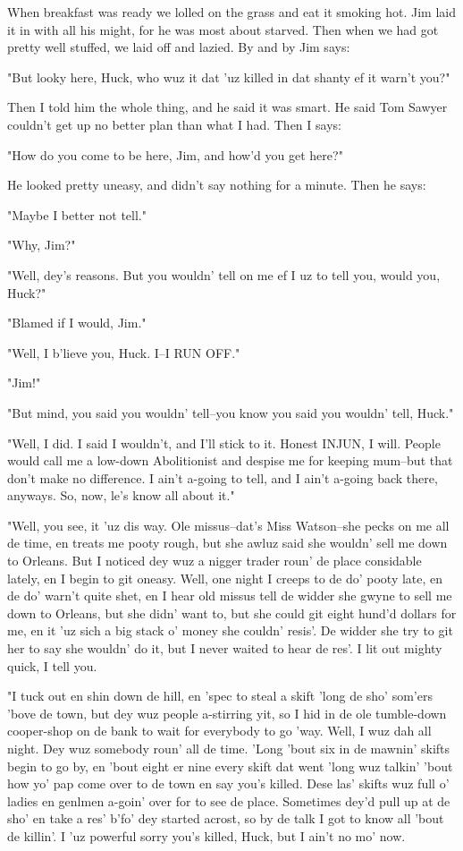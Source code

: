 When breakfast was ready we lolled on the grass and eat it smoking hot.
Jim laid it in with all his might, for he was most about starved.  Then
when we had got pretty well stuffed, we laid off and lazied.  By and by
Jim says:

"But looky here, Huck, who wuz it dat 'uz killed in dat shanty ef it
warn't you?"

Then I told him the whole thing, and he said it was smart.  He said Tom
Sawyer couldn't get up no better plan than what I had.  Then I says:

"How do you come to be here, Jim, and how'd you get here?"

He looked pretty uneasy, and didn't say nothing for a minute.  Then he
says:

"Maybe I better not tell."

"Why, Jim?"

"Well, dey's reasons.  But you wouldn' tell on me ef I uz to tell you,
would you, Huck?"

"Blamed if I would, Jim."

"Well, I b'lieve you, Huck.  I--I RUN OFF."

"Jim!"

"But mind, you said you wouldn' tell--you know you said you wouldn' tell,
Huck."

"Well, I did.  I said I wouldn't, and I'll stick to it.  Honest INJUN, I
will.  People would call me a low-down Abolitionist and despise me for
keeping mum--but that don't make no difference.  I ain't a-going to tell,
and I ain't a-going back there, anyways.  So, now, le's know all about
it."

"Well, you see, it 'uz dis way.  Ole missus--dat's Miss Watson--she pecks
on me all de time, en treats me pooty rough, but she awluz said she
wouldn' sell me down to Orleans.  But I noticed dey wuz a nigger trader
roun' de place considable lately, en I begin to git oneasy.  Well, one
night I creeps to de do' pooty late, en de do' warn't quite shet, en I
hear old missus tell de widder she gwyne to sell me down to Orleans, but
she didn' want to, but she could git eight hund'd dollars for me, en it
'uz sich a big stack o' money she couldn' resis'.  De widder she try to
git her to say she wouldn' do it, but I never waited to hear de res'.  I
lit out mighty quick, I tell you.

"I tuck out en shin down de hill, en 'spec to steal a skift 'long de sho'
som'ers 'bove de town, but dey wuz people a-stirring yit, so I hid in de
ole tumble-down cooper-shop on de bank to wait for everybody to go 'way.
Well, I wuz dah all night.  Dey wuz somebody roun' all de time.  'Long
'bout six in de mawnin' skifts begin to go by, en 'bout eight er nine
every skift dat went 'long wuz talkin' 'bout how yo' pap come over to de
town en say you's killed.  Dese las' skifts wuz full o' ladies en genlmen
a-goin' over for to see de place.  Sometimes dey'd pull up at de sho' en
take a res' b'fo' dey started acrost, so by de talk I got to know all
'bout de killin'.  I 'uz powerful sorry you's killed, Huck, but I ain't
no mo' now.

